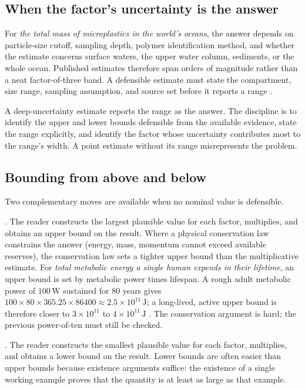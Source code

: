 \subsection{When the factor's uncertainty is the answer}

For \emph{the total mass of microplastics in the world's oceans},
the answer depends on particle-size cutoff, sampling depth, polymer
identification method, and whether the estimate concerns surface
waters, the upper water column, sediments, or the whole ocean.
Published estimates therefore span orders of magnitude rather than
a neat factor-of-three band. A defensible estimate must state the
compartment, size range, sampling assumption, and source set before
it reports a range \cite{paper:zhao2025-ocean-microplastics}.

A deep-uncertainty estimate reports the range as the answer. The
discipline is to identify the upper and lower bounds defensible
from the available evidence, state the range explicitly, and
identify the factor whose uncertainty contributes most to the
range's width. A point estimate without its range misrepresents the
problem.

\subsection{Bounding from above and below}

Two complementary moves are available when no nominal value is
defensible.

. The reader constructs the largest plausible
value for each factor, multiplies, and obtains an upper bound on the
result. Where a physical conservation law constrains the answer
(energy, mass, momentum cannot exceed available reserves), the
conservation law sets a tighter upper bound than the multiplicative
estimate. For \emph{total metabolic energy a single human expends in their
lifetime}, an upper bound is set by metabolic power times lifespan.
A rough adult metabolic power of $100 \,\si{\watt}$ sustained for
$80$ years gives $100 \times 80 \times 365.25 \times 86400 \approx
2.5 \times 10^{11} \,\si{\joule}$; a long-lived, active upper bound
is therefore closer to $3 \times 10^{11}$ to $4 \times 10^{11}
\,\si{\joule}$ \cite{text:national-academies-energy-1989}. The
conservation argument is hard; the previous power-of-ten must still
be checked.

. The reader constructs the smallest plausible
value for each factor, multiplies, and obtains a lower bound on the
result. Lower bounds are often easier than upper bounds because
existence arguments suffice: the existence of a single working
example proves that the quantity is at least as large as that
example.


